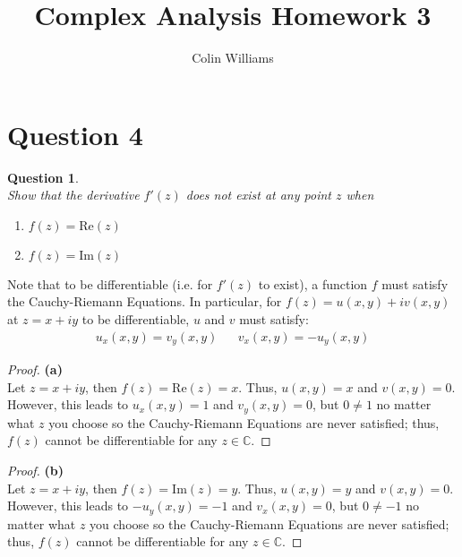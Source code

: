 \documentclass[10pt,a4paper]{article}
\title{Complex Analysis Homework 3}
\author{Colin Williams}
\newtheorem*{question*}{Question}
\theoremstyle{definition}
\begin{document}
\maketitle
\section*{Question 4}
\begin{question*}{$ $}
\\Show that the derivative $f'(z)$ does not exist at any point $z$ when 
\begin{enumerate}[label = (\alph*)]
\item $f(z) = \text{Re}(z)$
\item $f(z) = \text{Im}(z)$
\end{enumerate}

\end{question*}

Note that to be differentiable (i.e. for $f'(z)$ to exist), a function $f$ must satisfy the Cauchy-Riemann Equations. In particular, for $f(z) = u(x,y) + iv(x,y)$ at $z = x + iy$ to be differentiable, $u$ and $v$ must satisfy:
\begin{align}
u_x(x, y) = v_y(x, y) && v_x(x,y) = -u_y(x,y)
\end{align}

\begin{proof}{\textbf{(a)}}
\\Let $z = x + iy$, then $f(z) = \text{Re}(z) = x$. Thus, $u(x,y) = x$ and $v(x,y) = 0$. However, this leads to $u_x(x,y) = 1$ and $v_y(x,y) = 0$, but $0 \neq 1$ no matter what $z$ you choose so the Cauchy-Riemann Equations are never satisfied; thus, $f(z)$ cannot be differentiable for any $z \in \mathbb{C}$.
\end{proof}

\begin{proof}{\textbf{(b)}}
\\Let $z = x + iy$, then $f(z) = \text{Im}(z) = y$. Thus, $u(x,y) = y$ and $v(x,y) = 0$. However, this leads to $-u_y(x,y) = -1$ and $v_x(x,y) = 0$, but $0 \neq -1$ no matter what $z$ you choose so the Cauchy-Riemann Equations are never satisfied; thus, $f(z)$ cannot be differentiable for any $z \in \mathbb{C}$.
\end{proof}
\end{document}
